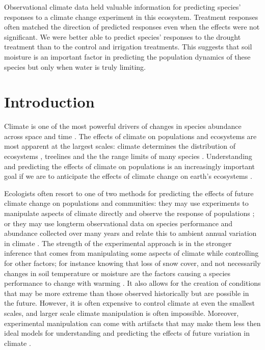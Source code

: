 \documentclass[11pt]{article}
\begin{document}
\begin{doublespacing}
Observational climate data held valuable information for predicting species' responses to a climate change experiment in this ecosystem. Treatment responses often matched the direction of predicted responses even when the effects were not significant. We were better able to predict species' responses to the drought treatment than to the control and irrigation treatments. This suggests that soil moisture is an important factor in predicting the population dynamics of these species but only when water is truly limiting.

\section*{Introduction}

Climate is one of the most powerful drivers of changes in species abundance across space and time \citep{post_synchronization_2002,davis_range_2001,walther_ecological_2002}. The effects of climate on populations and ecosystems are most apparent at the largest scales: climate determines the distribution of ecosystems \citep{whittaker_communities_1975}, treelines \citep{korner_alpine_2012} and the the range limits of many species \citep{parmesan_globally_2003,davis_range_2001}. Understanding and predicting the effects of climate on populations is an increasingly important goal if we are to anticipate the effects of climate change on earth's ecosystems \citep{tredennick_we_2016,petchey_ecological_2015,ehrlen_advancing_2016,teller_linking_2016}.
 
Ecologists often resort to one of two methods for predicting the effects of future climate change on populations and communities: they may use experiments to manipulate aspects of climate directly and observe the response of populations \citep{elmendorf_experiment_2015,knapp_pushing_2016,compagnoni_warming_2014}; or they may use longterm observational data on species performance and abundance collected over many years and relate this to ambient annual variation in climate  \citep{koons_climate_2012,lunn_demography_2016,dalgleish_climate_2010,jenouvrier_demographic_2009}. The strength of the experimental approach is in the stronger inference that comes from manipulating some aspects of climate while controlling for other factors; for instance knowing that loss of snow cover, and not necessarily changes in soil temperature or moisture are the factors causing a species performance to change with warming \citep{compagnoni_warming_2014}. It also allows for the creation of conditions that may be more extreme than those observed historically \cite{knapp_pushing_2016} but are possible in the future. However, it is often expensive to control climate at even the smallest scales, and larger scale climate manipulation is often impossible.  Moreover, experimental manipulation can come with artifacts that may make them less then ideal models for understanding and predicting the effects of future variation in climate \citep{wolkovich_warming_2012}. 


\end{doublespacing}
\end{document}

